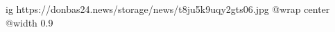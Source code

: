  
 
 
 
 

\ifcmt
  ig https://donbas24.news/storage/news/t8ju5k9uqy2gts06.jpg
  @wrap center
  @width 0.9
\fi
